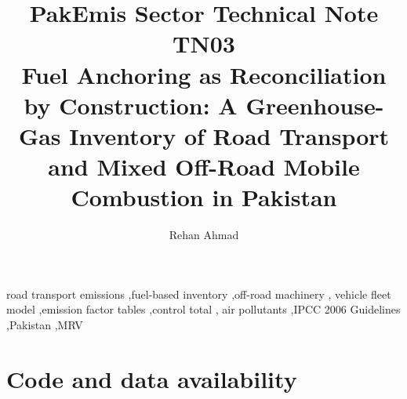 \documentclass[5p,times,authoryear]{elsarticle}
\begin{document}
\begin{frontmatter}

\title{PakEmis Sector Technical Note TN03\\[4pt]
Fuel Anchoring as Reconciliation by Construction: A Greenhouse-Gas Inventory of
Road Transport and Mixed Off-Road Mobile Combustion in Pakistan}

\author[paqi]{Rehan Ahmad}

\address[paqi]{Pakistan Air Quality Initiative (PAQI), Karachi, Pakistan}


\begin{abstract}

\end{abstract}

\begin{keyword}
road transport emissions \sep fuel-based inventory \sep off-road machinery \sep
vehicle fleet model \sep emission factor tables \sep control total \sep
air pollutants \sep IPCC 2006 Guidelines \sep Pakistan \sep MRV
\end{keyword}

\end{frontmatter}



\ReleaseCover







\FloatBarrier


\FloatBarrier



\FloatBarrier

\section*{Code and data availability}
\end{document}
